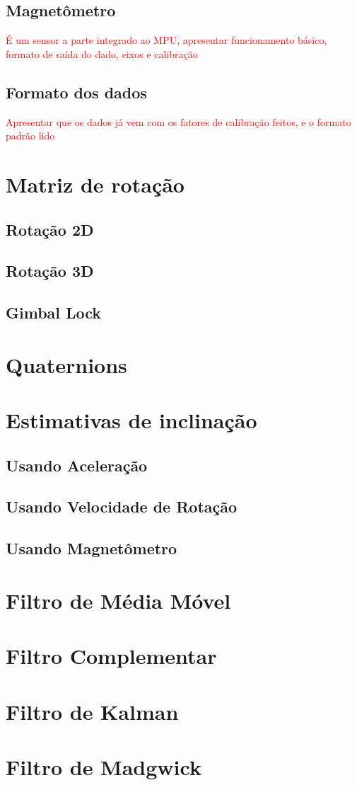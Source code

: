     \subsection{Magnetômetro}
    \textcolor{red}{É um sensor a parte integrado ao MPU, apresentar funcionamento básico, formato de saída do dado, eixos e calibração}
    
    \subsection{Formato dos dados}
    \textcolor{red}{Apresentar que os dados já vem com os fatores de calibração feitos, e o formato padrão lido}
    
\section{Matriz de rotação}
    \subsection{Rotação 2D}
    \subsection{Rotação 3D}
    \subsection{Gimbal Lock}
\section{Quaternions}
\section{Estimativas de inclinação}
    \subsection{Usando Aceleração}
    \subsection{Usando Velocidade de Rotação}
    \subsection{Usando Magnetômetro}
\section{Filtro de Média Móvel}
\section{Filtro Complementar}
\section{Filtro de Kalman}
\section{Filtro de Madgwick}
